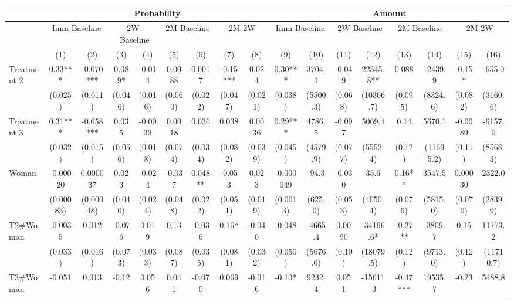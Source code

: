 \begin{tabular}{lcccccccccccccccc}
\toprule
      & \multicolumn{8}{c|}{Probability}                              & \multicolumn{8}{c}{Amount} \\
\midrule
\midrule
      & \multicolumn{2}{c}{Imm-Baseline} & \multicolumn{2}{c}{2W-Baseline} & \multicolumn{2}{c}{2M-Baseline} & \multicolumn{2}{c|}{2M-2W} & \multicolumn{2}{c}{Imm-Baseline} & \multicolumn{2}{c}{2W-Baseline} & \multicolumn{2}{c}{2M-Baseline} & \multicolumn{2}{c}{2M-2W} \\
\midrule
      & (1)   & (2)   & (3)   & (4)   & (5)   & (6)   & (7)   & \multicolumn{1}{c|}{(8)} & (9)   & (10)  & (11)  & (12)  & (13)  & (14)  & (15)  & (16) \\
\midrule
\midrule
Treatment 2 & 0.33*** & -0.070*** & 0.089* & -0.014 & 0.0088 & 0.0017 & -0.15*** & 0.024 & 0.30*** & 3704.1 & -0.049 & 22545.8** & 0.088 & 12439.9 & -0.15* & -655.0 \\
      & (0.025) & (0.011) & (0.046) & (0.016) & (0.060) & (0.022) & (0.047) & (0.021) & (0.038) & (5500.3) & (0.068) & (10306.7) & (0.095) & (8324.6) & (0.082) & (3160.6) \\
Treatment 3 & 0.31*** & -0.058*** & 0.035 & -0.0039 & 0.0018 & 0.036 & 0.038 & 0.0036 & 0.29*** & 4786.5 & -0.097 & 5069.4 & 0.14  & 5670.1 & -0.0089 & -6157.0 \\
      & (0.032) & (0.015) & (0.056) & (0.018) & (0.074) & (0.034) & (0.082) & (0.039) & (0.045) & (4579.9) & (0.077) & (5552.4) & (0.12) & (11695.2) & (0.11) & (8568.3) \\
Woman & -0.00020 & 0.000037 & 0.023 & -0.024 & -0.037 & 0.048** & -0.053 & 0.023 & -0.000049 & -94.3 & -0.030 & 35.6  & 0.16** & 3547.5 & 0.00030 & 2322.0 \\
      & (0.00083) & (0.00048) & (0.040) & (0.024) & (0.048) & (0.022) & (0.051) & (0.019) & (0.0013) & (625.0) & (0.053) & (4050.4) & (0.076) & (5815.0) & (0.070) & (2839.9) \\
T2\#Woman & -0.0035 & 0.012 & -0.076 & 0.019 & 0.13  & -0.036 & 0.16* & -0.040 & -0.048 & -4665.4 & 0.0090 & -34196.6* & -0.27** & -3809.7 & 0.15  & 11773.2 \\
      & (0.033) & (0.016) & (0.073) & (0.033) & (0.087) & (0.035) & (0.081) & (0.032) & (0.050) & (5676.0) & (0.10) & (18079.5) & (0.12) & (9713.0) & (0.12) & (11710.7) \\
T3\#Woman & -0.051 & 0.013 & -0.12 & 0.056 & 0.041 & -0.070 & 0.069 & -0.016 & -0.10* & 9232.4 & 0.051 & -15611.3 & -0.47*** & 19535.7 & -0.23 & 5488.8 \\

\end{tabular}
